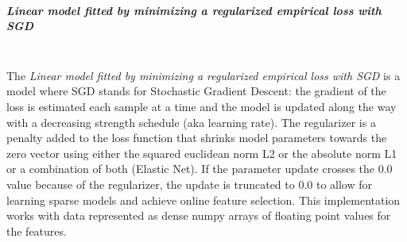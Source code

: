 \subparagraph{Linear model fitted by minimizing a regularized empirical loss
with SGD}
\mbox{}
\\The \textit{Linear model fitted by minimizing a regularized empirical loss
with SGD} is a model where SGD stands for Stochastic Gradient Descent: the
gradient of the loss is estimated each sample at a time and the model is updated
along the way with a decreasing strength schedule (aka learning rate).
%
The regularizer is a penalty added to the loss function that shrinks model
parameters towards the zero vector using either the squared euclidean norm L2 or
the absolute norm L1 or a combination of both (Elastic Net).
%
If the parameter update crosses the 0.0 value because of the regularizer, the
update is truncated to 0.0 to allow for learning sparse models and achieve
online feature selection.
%
This implementation works with data represented as dense numpy arrays of
floating point values for the features.
%

